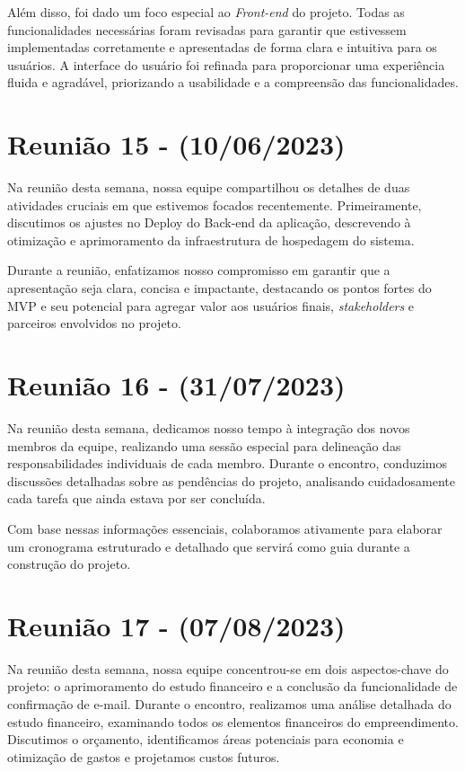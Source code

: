 \begin{apendicesenv}
Além disso, foi dado um foco especial ao \textit{\gls{Front-end}} do projeto. Todas as funcionalidades necessárias foram revisadas para garantir que estivessem implementadas corretamente e apresentadas de forma clara e intuitiva para os usuários. A interface do usuário foi refinada para proporcionar uma experiência fluida e agradável, priorizando a usabilidade e a compreensão das funcionalidades.

\section{Reunião 15 - (10/06/2023)}
Na reunião desta semana, nossa equipe compartilhou os detalhes de duas atividades cruciais em que estivemos focados recentemente. Primeiramente, discutimos os ajustes no Deploy do Back-end da aplicação, descrevendo à otimização e aprimoramento da infraestrutura de hospedagem do sistema. 

Durante a reunião, enfatizamos nosso compromisso em garantir que a apresentação seja clara, concisa e impactante, destacando os pontos fortes do MVP e seu potencial para agregar valor aos usuários finais, \textit{stakeholders} e parceiros envolvidos no projeto.

\section{Reunião 16 - (31/07/2023)}
Na reunião desta semana, dedicamos nosso tempo à integração dos novos membros da equipe, realizando uma sessão especial para delineação das responsabilidades individuais de cada membro. Durante o encontro, conduzimos discussões detalhadas sobre as pendências do projeto, analisando cuidadosamente cada tarefa que ainda estava por ser concluída.

Com base nessas informações essenciais, colaboramos ativamente para elaborar um cronograma estruturado e detalhado que servirá como guia durante a construção do projeto. 

\section{Reunião 17 - (07/08/2023)}
Na reunião desta semana, nossa equipe concentrou-se em dois aspectos-chave do projeto: o aprimoramento do estudo financeiro e a conclusão da funcionalidade de confirmação de e-mail. Durante o encontro, realizamos uma análise detalhada do estudo financeiro, examinando todos os elementos financeiros do empreendimento. Discutimos o orçamento, identificamos áreas potenciais para economia e otimização de gastos e projetamos custos futuros.


\end{apendicesenv}
